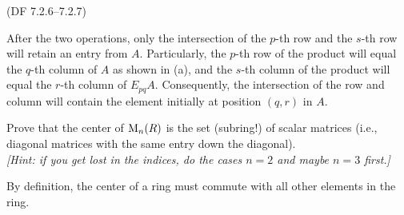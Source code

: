 \begin{problem}{(\textsf{DF 7.2.6--7.2.7})}
\begin{enumalph}
\begin{Answer}
\begin{enumalph}
          \item After the two operations, only the intersection of the $p$-th row
            and the $s$-th row will retain an entry from $A$.
            Particularly, the $p$-th row of the product will equal the  $q$-th column of $A$
            as shown in (a), and the $s$-th column of the product will equal the $r$-th
            column of $E_{pq}A$. Consequently, the intersection of the row and column
            will contain the element initially at position $(q, r)$ in $A$.
        \end{enumalph}
      \end{Answer}
    \newpage
    \item Prove that the center of $\operatorname{M}_n(R)$ is the set (subring!) of scalar matrices 
      (i.e., diagonal matrices with the same entry down the diagonal). \\
      \emph{[Hint: if you get lost in the indices, do the cases $n=2$ and maybe $n=3$ first.]}
      \begin{Answer}
        By definition, the center of a ring must commute with all other elements in the ring.


\end{Answer}
\end{enumalph}
\end{problem}
